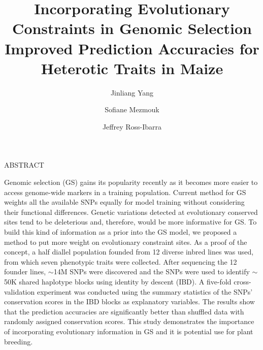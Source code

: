\documentclass[12pt]{article}
\title{Incorporating Evolutionary Constraints in Genomic Selection Improved Prediction Accuracies for Heterotic Traits in Maize}
\date{}
\author[1]{Jinliang Yang}
\author[1,2]{Sofiane Mezmouk}
\author[1]{Jeffrey Ross-Ibarra}
\affil[1]{Department of Plant Sciences, University of California, Davis, CA 95616}
\affil[2]{Current address: Institute of sciences, Somewhere, Street of Something}
\newcommand{\smalllineskip}{\baselineskip=15pt}
\renewenvironment{abstract}[0]{\small\rm
        \begin{center}ABSTRACT
        \\ \vspace{8pt}
        \begin{minipage}{5.2in}\smalllineskip
        \hspace{1pc}}{\end{minipage}\end{center}\vspace{-1pt}}
\begin{document}
\maketitle

\begin{abstract}

Genomic selection (GS) gains its popularity recently as it becomes more easier to access genome-wide markers in a training population. Current method for GS weights all the available SNPs equally for model training without considering their functional differences. Genetic variations detected at evolutionary conserved sites tend to be deleterious and, therefore, would be more informative for GS. To build this kind of information as a prior into the GS model, we proposed a method to put more weight on evolutionary constraint sites. As a proof of the concept, a half diallel population founded from 12 diverse inbred lines was used, from which seven phenotypic traits were collected. After sequencing the 12 founder lines, $\sim$14M SNPs were discovered and the SNPs were used to identify $\sim$50K shared haplotype blocks using identity by descent (IBD). A five-fold cross-validation experiment was conducted using the summary statistics of the SNPs' conservation scores in the IBD blocks as explanatory variables. The results show that the prediction accuracies are significantly better than shuffled data with randomly assigned conservation scores. This study demonstrates the importance of incorporating evolutionary information in GS and it is potential use for plant breeding.

\end{abstract}
\end{document}
